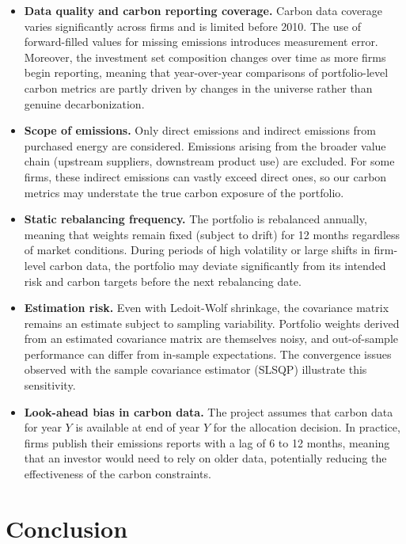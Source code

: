\documentclass[11pt,a4paper]{article}
\begin{document}
\begin{itemize}[leftmargin=*]
    \item \textbf{Data quality and carbon reporting coverage.} Carbon data coverage varies significantly across firms and is limited before 2010. The use of forward-filled values for missing emissions introduces measurement error. Moreover, the investment set composition changes over time as more firms begin reporting, meaning that year-over-year comparisons of portfolio-level carbon metrics are partly driven by changes in the universe rather than genuine decarbonization.

    \item \textbf{Scope of emissions.} Only direct emissions and indirect emissions from purchased energy are considered. Emissions arising from the broader value chain (upstream suppliers, downstream product use) are excluded. For some firms, these indirect emissions can vastly exceed direct ones, so our carbon metrics may understate the true carbon exposure of the portfolio.

    \item \textbf{Static rebalancing frequency.} The portfolio is rebalanced annually, meaning that weights remain fixed (subject to drift) for 12 months regardless of market conditions. During periods of high volatility or large shifts in firm-level carbon data, the portfolio may deviate significantly from its intended risk and carbon targets before the next rebalancing date.

    \item \textbf{Estimation risk.} Even with Ledoit-Wolf shrinkage, the covariance matrix remains an estimate subject to sampling variability. Portfolio weights derived from an estimated covariance matrix are themselves noisy, and out-of-sample performance can differ from in-sample expectations. The convergence issues observed with the sample covariance estimator (SLSQP) illustrate this sensitivity.

    \item \textbf{Look-ahead bias in carbon data.} The project assumes that carbon data for year $Y$ is available at end of year $Y$ for the allocation decision. In practice, firms publish their emissions reports with a lag of 6 to 12 months, meaning that an investor would need to rely on older data, potentially reducing the effectiveness of the carbon constraints.
\end{itemize}

\section{Conclusion}
\label{sec:conclusion}
\end{document}
